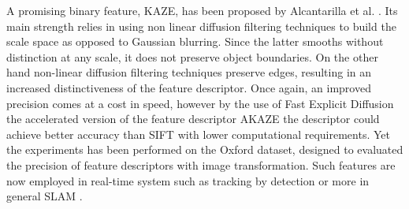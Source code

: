 A promising binary feature, KAZE, has been proposed by Alcantarilla et al. \cite{alcantarilla12}. Its main strength relies in using non linear diffusion filtering techniques \cite{weickert98} to build the scale space as opposed to Gaussian blurring. Since the latter smooths without distinction at any scale, it does not preserve object boundaries. On the other hand non-linear diffusion filtering techniques preserve edges, resulting in an increased distinctiveness of the feature descriptor. Once again, an improved precision comes at a cost in speed, however by the use of Fast Explicit Diffusion \cite{goesele2010} the accelerated version of the feature descriptor AKAZE \cite{alcantarilla13} the descriptor could achieve better accuracy than SIFT with lower computational requirements. Yet the experiments has been performed on the Oxford dataset, designed to evaluated the precision of feature descriptors with image transformation. Such features are now employed in real-time system such as tracking by detection \cite{nebehay2014,pieropan15,pieropan15b} or more in general SLAM \cite{murartal2015}. 

